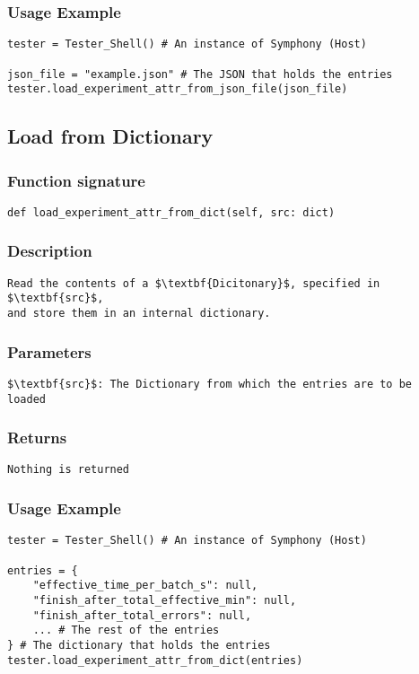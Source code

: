 \newpage
\subsubsection{Usage Example}
\begin{lstlisting}
tester = Tester_Shell() # An instance of Symphony (Host)

json_file = "example.json" # The JSON that holds the entries
tester.load_experiment_attr_from_json_file(json_file)
\end{lstlisting}


\subsection{Load from Dictionary}
\subsubsection{Function signature}

\begin{lstlisting}
def load_experiment_attr_from_dict(self, src: dict)
\end{lstlisting}

\subsubsection{Description}
\begin{lstlisting}[mathescape=true, keywordstyle=\color{black}]
Read the contents of a $\textbf{Dicitonary}$, specified in $\textbf{src}$, 
and store them in an internal dictionary. 
\end{lstlisting}

\subsubsection{Parameters}
\begin{lstlisting}[mathescape=true, keywordstyle=\color{black}]
$\textbf{src}$: The Dictionary from which the entries are to be 
loaded
\end{lstlisting}

\subsubsection{Returns}
\begin{lstlisting}[mathescape=true, keywordstyle=\color{black}]
Nothing is returned
\end{lstlisting}

\subsubsection{Usage Example}
\begin{lstlisting}
tester = Tester_Shell() # An instance of Symphony (Host)

entries = {
    "effective_time_per_batch_s": null,
    "finish_after_total_effective_min": null,
    "finish_after_total_errors": null,
    ... # The rest of the entries
} # The dictionary that holds the entries
tester.load_experiment_attr_from_dict(entries)
\end{lstlisting}